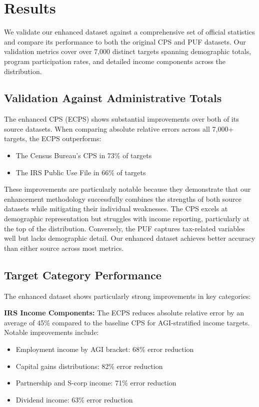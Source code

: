 \section{Results}

We validate our enhanced dataset against a comprehensive set of official statistics and compare its performance to both the original CPS and PUF datasets. Our validation metrics cover over 7,000 distinct targets spanning demographic totals, program participation rates, and detailed income components across the distribution.

\subsection{Validation Against Administrative Totals}

The enhanced CPS (ECPS) shows substantial improvements over both of its source datasets. When comparing absolute relative errors across all 7,000+ targets, the ECPS outperforms:
\begin{itemize}
    \item The Census Bureau's CPS in 73\% of targets
    \item The IRS Public Use File in 66\% of targets
\end{itemize}

These improvements are particularly notable because they demonstrate that our enhancement methodology successfully combines the strengths of both source datasets while mitigating their individual weaknesses. The CPS excels at demographic representation but struggles with income reporting, particularly at the top of the distribution. Conversely, the PUF captures tax-related variables well but lacks demographic detail. Our enhanced dataset achieves better accuracy than either source across most metrics.

\subsection{Target Category Performance}

The enhanced dataset shows particularly strong improvements in key categories:

\textbf{IRS Income Components:} The ECPS reduces absolute relative error by an average of 45\% compared to the baseline CPS for AGI-stratified income targets. Notable improvements include:
\begin{itemize}
    \item Employment income by AGI bracket: 68\% error reduction
    \item Capital gains distributions: 82\% error reduction  
    \item Partnership and S-corp income: 71\% error reduction
    \item Dividend income: 63\% error reduction
\end{itemize}

